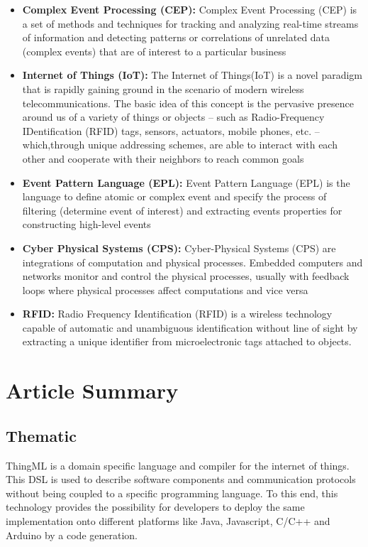 \documentclass{article}
\begin{document}
\begin{itemize}
    \item \textbf{Complex Event Processing (CEP):} Complex Event Processing (CEP) is a set of methods and techniques for tracking
and analyzing real-time streams of information and detecting patterns or correlations
of unrelated data (complex events) that are of interest to a particular
business \cite{1}
	\item \textbf{Internet of Things (IoT):} The Internet of Things(IoT) is a novel paradigm that is rapidly gaining ground in the scenario of modern wireless telecommunications. The basic idea of this concept is the pervasive presence around us of a variety of things or objects – such as Radio-Frequency IDentification (RFID) tags, sensors, actuators, mobile phones, etc. – which,through unique addressing schemes, are able to interact with each other and cooperate with their neighbors to reach common goals \cite{2}
	\item \textbf{Event Pattern Language (EPL):} Event Pattern Language (EPL) is the language
to define atomic or complex event and specify the process of filtering (determine event of interest) and extracting events properties for constructing high-level events \cite{4}
	\item \textbf{Cyber Physical Systems (CPS):} Cyber-Physical Systems (CPS) are integrations of computation and physical processes. Embedded computers and networks monitor and control the physical processes, usually with feedback loops where physical processes affect computations and vice versa \cite{5}
	\item \textbf{RFID:} Radio Frequency Identification (RFID) is a wireless technology capable of automatic and unambiguous identification without line of sight by extracting a unique identifier from microelectronic tags attached to objects. \cite{3}
\end{itemize}


\section{Article Summary}

\subsection{Thematic}

ThingML is a domain specific language and compiler for the internet of things. This DSL is used to describe software components and communication protocols without being coupled to a specific programming language. To this end, this technology provides the possibility for developers to deploy the same implementation onto different platforms like Java, Javascript, C/C++ and Arduino by a code generation.
\end{document}
